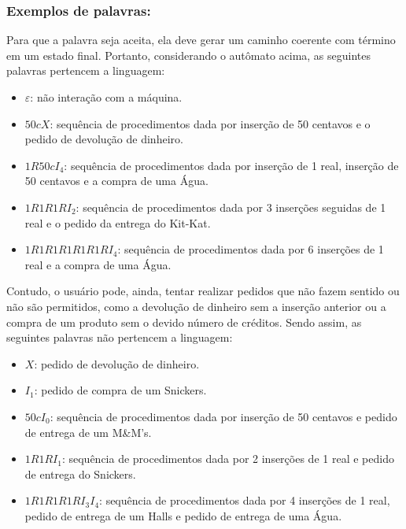 \documentclass{article}
\begin{document}
\subsubsection*{Exemplos de palavras:}
\par Para que a palavra seja aceita, ela deve gerar um caminho coerente com t\'ermino em um estado final. Portanto, considerando o aut\^omato acima, as seguintes palavras pertencem a linguagem:
\begin{itemize}
  \item $\varepsilon$: n\~ao intera\c{c}\~ao com a m\'aquina.
  \item $50cX$: sequ\^encia de procedimentos dada por inser\c{c}\~ao de 50 centavos e o pedido de devolu\c{c}\~ao de dinheiro.
  \item $1R50cI_{4}$: sequ\^encia de procedimentos dada por inser\c{c}\~ao de 1 real, inser\c{c}\~ao de 50 centavos e a compra de uma \'Agua.
  \item $1R1R1RI_{2}$: sequ\^encia de procedimentos dada por 3 inser\c{c}\~oes seguidas de 1 real e o pedido da entrega do Kit-Kat.
  \item $1R1R1R1R1R1RI_{4}$: sequ\^encia de procedimentos dada por 6 inser\c{c}\~oes de 1 real e a compra de uma \'Agua.
\end{itemize}
Contudo, o usu\'ario pode, ainda, tentar realizar pedidos que n\~ao fazem sentido ou n\~ao s\~ao permitidos, como a devolu\c{c}\~ao de dinheiro sem a inser\c{c}\~ao anterior ou a compra de um produto sem o devido n\'umero de cr\'editos. Sendo assim, as seguintes palavras n\~ao pertencem a linguagem:
\begin{itemize}
  \item $X$: pedido de devolu\c{c}\~ao de dinheiro.
  \item $I_{1}$: pedido de compra de um Snickers.
  \item $50cI_{0}$: sequ\^encia de procedimentos dada por inser\c{c}\~ao de 50 centavos e pedido de entrega de um M\&M's.
  \item $1R1RI_{1}$: sequ\^encia de procedimentos dada por 2 inser\c{c}\~oes de 1 real e pedido de entrega do Snickers.
  \item $1R1R1R1RI_{3}I_{4}$: sequ\^encia de procedimentos dada por 4 inser\c{c}\~oes de 1 real, pedido de entrega de um Halls e pedido de entrega de uma \'Agua.
\end{itemize}
\end{document}
